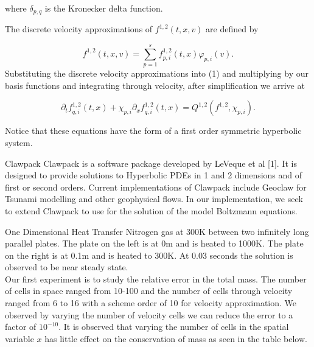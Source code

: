 \documentclass[unknownkeysallowed,final]{beamer}
\begin{document}
\begin{frame}{}
\begin{textblock}{18}
\begin{block}{\small{}}
where $\delta_{p,q}$ is the Kronecker delta function.

The discrete velocity approximations of $f^{1,2}(t,x,v)$ are defined by

\begin{equation*}
\label{eq0x}
f^{1,2}(t,x,v)=\sum_{p=1} ^{s} f_{p,i}^{1,2}(t,x) \varphi_{p,i}(v).
\end{equation*}
Substituting the discrete velocity approximations into (1) and multiplying by our basis functions and integrating through velocity, after simplification we arrive at

\begin{equation*}
\label{eqint}
\partial_{t} f_{q,i}^{1,2}(t,x) + \chi_{p,i} \partial_{x} f_{q,i}^{1,2}(t,x) = Q^{1,2}(f^{1,2},\chi_{p,i}).
\end{equation*}

Notice that these equations have the form of a first order symmetric hyperbolic system.

\end{block}

\begin{block}{\small{Clawpack}}
Clawpack is a software package developed by LeVeque et al [1]. It is designed to provide solutions to Hyperbolic PDEs in 1 and 2 dimensions and of first or second orders. Current implementations of Clawpack include Geoclaw for Tsunami modelling and other geophysical flows. In our implementation, we seek to extend Clawpack to use for the solution of the model Boltzmann equations.
\end{block}

\begin{block}{\small{One Dimensional Heat Transfer}}
Nitrogen gas at 300K between two infinitely long parallel plates. The plate on the left is at 0m and is heated to 1000K. The plate on the right is at 0.1m and is heated to 300K. At 0.03 seconds the solution is observed to be near steady state.\\[2mm]
Our first experiment is to study the relative error in the total mass. The number of cells in space ranged from 10-100 and the number of cells through velocity ranged from 6 to 16 with a scheme order of 10 for velocity approximation.
We observed by varying the number of velocity cells we can reduce the error to a factor of $10^{-10}$. It is observed that varying the number of cells in the spatial variable $x$ has little effect on the conservation of mass as seen in the table below.


\end{block}
\end{textblock}
\end{frame}
\end{document}
